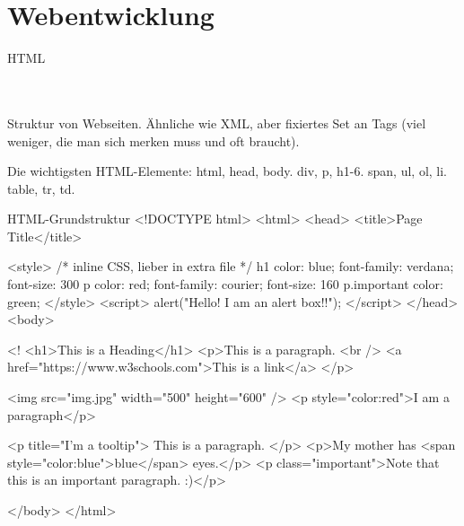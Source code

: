 








\section{Webentwicklung}


\begin{frame}{HTML}

\\
\\
Struktur von Webseiten. Ähnliche wie XML, aber fixiertes Set an Tags (viel weniger, die man sich merken muss und oft braucht).

Die wichtigsten HTML-Elemente: 
html, head, body.
div, p, h1-6.
span,
ul, ol, li.
table, tr, td.
\smallskip

\begin{myhtml}{HTML-Grundstruktur}
<!DOCTYPE html>
<html>
<head>
<title>Page Title</title>

<style> /* inline CSS, lieber in extra file */
h1 {
  color: blue;
  font-family: verdana;
  font-size: 300%
}
p  {
  color: red;
  font-family: courier;
  font-size: 160%
}
p.important {
    color: green;
}
</style>
<script>
alert("Hello! I am an alert box!!");
</script>
</head>
<body>

<!
<h1>This is a Heading</h1>
<p>This is a paragraph. <br />
<a href="https://www.w3schools.com">This is a link</a>
</p>

<img src="img.jpg" width="500" height="600" />
<p style="color:red">I am a paragraph</p>

<p title="I'm a tooltip">
This is a paragraph.
</p>
<p>My mother has <span style="color:blue">blue</span> eyes.</p>
<p class="important">Note that this is an important paragraph. :)</p>


</body>
</html>
\end{myhtml}
\end{frame}

